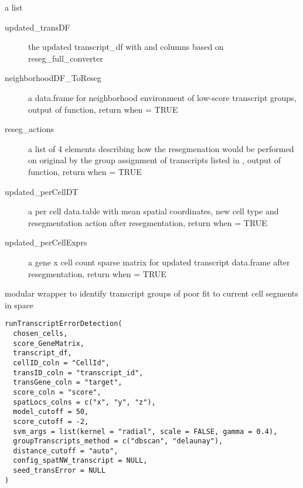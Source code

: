 \documentclass[letterpaper]{book}
\begin{document}
%
\begin{Value}
a list
\begin{description}

\item[updated\_transDF] the updated transcript\_df with  and  columns based on reseg\_full\_converter
\item[neighborhoodDF\_ToReseg] a data.frame for neighborhood environment of low-score transcript groups, output of  function, return when  = TRUE
\item[reseg\_actions] a list of 4 elements describing how the resegmenation would be performed on original  by the group assignment of transcripts listed in , output of  function, return when  = TRUE
\item[updated\_perCellDT] a per cell data.table with mean spatial coordinates, new cell type and resegmentation action after resegmentation, return when  = TRUE
\item[updated\_perCellExprs] a gene x cell count sparse matrix for updated transcript data.frame after resegmentation, return when  = TRUE

\end{description}

\end{Value}
%
\begin{Description}
modular wrapper to identify transcript groups of poor fit to current cell segments in space
\end{Description}
%
\begin{Usage}
\begin{verbatim}
runTranscriptErrorDetection(
  chosen_cells,
  score_GeneMatrix,
  transcript_df,
  cellID_coln = "CellId",
  transID_coln = "transcript_id",
  transGene_coln = "target",
  score_coln = "score",
  spatLocs_colns = c("x", "y", "z"),
  model_cutoff = 50,
  score_cutoff = -2,
  svm_args = list(kernel = "radial", scale = FALSE, gamma = 0.4),
  groupTranscripts_method = c("dbscan", "delaunay"),
  distance_cutoff = "auto",
  config_spatNW_transcript = NULL,
  seed_transError = NULL
)
\end{verbatim}
\end{Usage}
\end{document}
